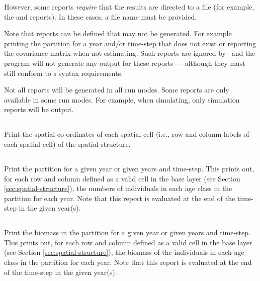 However, some reports \emph{require} that the results are directed to a file (for example, the  and  reports). In these cases, a file name must be provided.

Note that reports can be defined that may not be generated. For example printing the partition for a year and/or time-step that does not exist or reporting the covariance matrix when not estimating. Such reports are ignored by \SPM\ and the program will not generate any output for these reports --- although they must still conform to \SPM s syntax requirements.

Not all reports will be generated in all run modes. Some reports are only available in some run modes. For example, when simulating, only simulation reports will be output.

\subsection{}

Print the spatial co-ordinates of each spatial cell (i.e., row and column labels of each spatial cell) of the spatial structure.

\subsection{}

Print the partition for a given year or given years and time-step. This prints out, for each row and column defined as a valid cell in the base layer (see Section \ref{sec:spatial-structure}), the numbers of individuals in each age class in the partition for each year. Note that this report is evaluated at the end of the time-step in the given year(s).

\subsection{}

Print the biomass in the partition for a given year or given years and time-step. This prints out, for each row and column defined as a valid cell in the base layer (see Section \ref{sec:spatial-structure}), the biomass of the individuals in each age class in the partition for each year. Note that this report is evaluated at the end of the time-step in the given year(s).

